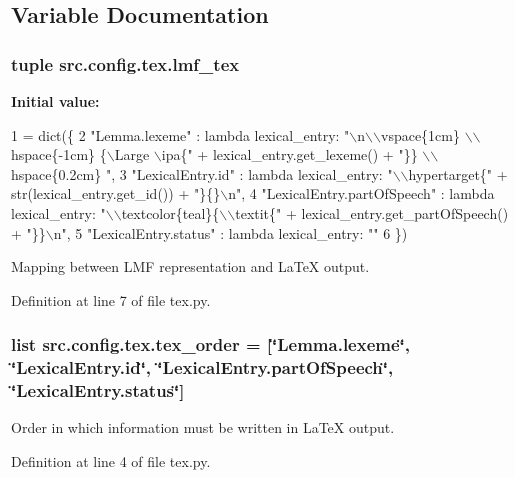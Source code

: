 \subsection{Variable Documentation}
\hypertarget{namespacesrc_1_1config_1_1tex_ab73c6746f87c74d6f58c26f60a5f4d5e}{
\subsubsection[{lmf\+\_\+tex}]{\setlength{\rightskip}{0pt plus 5cm}tuple src.\+config.\+tex.\+lmf\+\_\+tex}}\label{namespacesrc_1_1config_1_1tex_ab73c6746f87c74d6f58c26f60a5f4d5e}
{\bfseries Initial value\+:}
\begin{DoxyCode}
1 = dict(\{
2     \textcolor{stringliteral}{"Lemma.lexeme"} : \textcolor{keyword}{lambda} lexical\_entry: \textcolor{stringliteral}{"\(\backslash\)n\(\backslash\)\(\backslash\)vspace\{1cm\} \(\backslash\)\(\backslash\)hspace\{-1cm\} \{\(\backslash\)Large \(\backslash\)ipa\{"} + 
      lexical\_entry.get\_lexeme() + \textcolor{stringliteral}{"\}\} \(\backslash\)\(\backslash\)hspace\{0.2cm\} "},
3     \textcolor{stringliteral}{"LexicalEntry.id"} : \textcolor{keyword}{lambda} lexical\_entry: \textcolor{stringliteral}{"\(\backslash\)\(\backslash\)hypertarget\{"} + str(lexical\_entry.get\_id()) + \textcolor{stringliteral}{"\}\{\}\(\backslash\)n"},
4     \textcolor{stringliteral}{"LexicalEntry.partOfSpeech"} : \textcolor{keyword}{lambda} lexical\_entry: \textcolor{stringliteral}{"\(\backslash\)\(\backslash\)textcolor\{teal\}\{\(\backslash\)\(\backslash\)textit\{"} + 
      lexical\_entry.get\_partOfSpeech() + \textcolor{stringliteral}{"\}\}\(\backslash\)n"},
5     \textcolor{stringliteral}{"LexicalEntry.status"} : \textcolor{keyword}{lambda} lexical\_entry: \textcolor{stringliteral}{""}
6 \})
\end{DoxyCode}


Mapping between L\+M\+F representation and La\+Te\+X output. 



Definition at line 7 of file tex.\+py.

\hypertarget{namespacesrc_1_1config_1_1tex_a11191ac7f2134958a9de8155e88af9a9}{
\subsubsection[{tex\+\_\+order}]{\setlength{\rightskip}{0pt plus 5cm}list src.\+config.\+tex.\+tex\+\_\+order = \mbox{[}\char`\"{}Lemma.\+lexeme\char`\"{}, \char`\"{}Lexical\+Entry.\+id\char`\"{}, \char`\"{}Lexical\+Entry.\+part\+Of\+Speech\char`\"{}, \char`\"{}Lexical\+Entry.\+status\char`\"{}\mbox{]}}}\label{namespacesrc_1_1config_1_1tex_a11191ac7f2134958a9de8155e88af9a9}


Order in which information must be written in La\+Te\+X output. 



Definition at line 4 of file tex.\+py.

